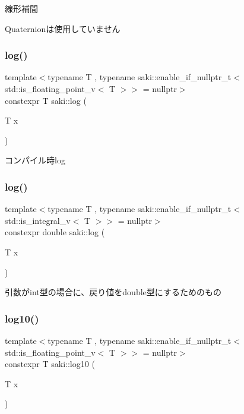 線形補間 

Quaternionは使用していません \mbox{\label{namespacesaki_a64136b916afd50ceb9bfb93ae12c63fb}} 
\subsubsection{\texorpdfstring{log()}{log()}\hspace{0.1cm}{\footnotesize\ttfamily [1/2]}}
{\footnotesize\ttfamily template$<$typename T , typename saki\+::enable\+\_\+if\+\_\+nullptr\+\_\+t$<$ std\+::is\+\_\+floating\+\_\+point\+\_\+v$<$ T $>$$>$  = nullptr$>$ \\
constexpr T saki\+::log (\begin{DoxyParamCaption}\item[{T}]{x }\end{DoxyParamCaption})}



コンパイル時log 

\mbox{\label{namespacesaki_a7f260fd4311e2bd21ae770f8aed6fa81}} 
\subsubsection{\texorpdfstring{log()}{log()}\hspace{0.1cm}{\footnotesize\ttfamily [2/2]}}
{\footnotesize\ttfamily template$<$typename T , typename saki\+::enable\+\_\+if\+\_\+nullptr\+\_\+t$<$ std\+::is\+\_\+integral\+\_\+v$<$ T $>$$>$  = nullptr$>$ \\
constexpr double saki\+::log (\begin{DoxyParamCaption}\item[{T}]{x }\end{DoxyParamCaption})}



引数がint型の場合に、戻り値をdouble型にするためのもの 

\mbox{\label{namespacesaki_aa1a5f3dfe15009e9e985b8b0647211e6}} 
\subsubsection{\texorpdfstring{log10()}{log10()}\hspace{0.1cm}{\footnotesize\ttfamily [1/2]}}
{\footnotesize\ttfamily template$<$typename T , typename saki\+::enable\+\_\+if\+\_\+nullptr\+\_\+t$<$ std\+::is\+\_\+floating\+\_\+point\+\_\+v$<$ T $>$$>$  = nullptr$>$ \\
constexpr T saki\+::log10 (\begin{DoxyParamCaption}\item[{T}]{x }\end{DoxyParamCaption})}



